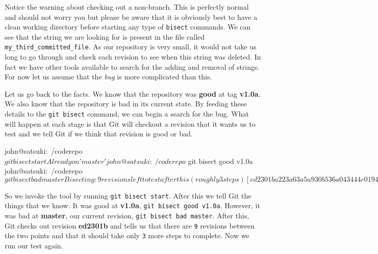 
Notice the warning about checking out a non-branch.
This is perfectly normal and should not worry you but please be aware that it is obviously best to have a clean working directory before starting any type of \texttt{bisect} commands.
We can see that the string we are looking for is present in the file called \texttt{my\_third\_committed\_file}.
As our repository is very small, it would not take us long to go through and check each revision to see when this string was deleted.
In fact we have other tools available to search for the adding and removal of strings.
For now let us assume that the \emph{bug} is more complicated than this.

Let us go back to the facts.
We know that the repository was \textbf{good} at tag \textbf{v1.0a}.
We also know that the repository is bad in its current state.
By feeding these details to the \texttt{git bisect} command, we can begin a search for the bug.
What will happen at each stage is that Git will checkout a revision that it wants us to test and we tell Git if we think that revision is good or bad.

\begin{code}
john@satsuki:~/coderepo$ git bisect start
Already on 'master'
john@satsuki:~/coderepo$ git bisect good v1.0a
john@satsuki:~/coderepo$ git bisect bad master
Bisecting: 9 revisions left to test after this (roughly 3 steps)
[ed2301ba223a63a5a930b536a043444e019460a7] Removed third file
john@satsuki:~/coderepo$
\end{code}

So we invoke the tool by running \texttt{git bisect start}.
After this we tell Git the things that we know. It was good at \textbf{v1.0a}, \texttt{git bisect good v1.0a}.
However, it was bad at \textbf{master}, our current revision, \texttt{git bisect bad master}.
After this, Git checks out revision \textbf{ed2301b} and tells us that there are \texttt{9} revisions between the two points and that it should take only \texttt{3} more steps to complete.
Now we run our test again.


